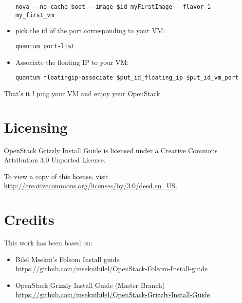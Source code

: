 \begin{itemize}
\begin{verbatim}
nova --no-cache boot --image $id_myFirstImage --flavor 1 my_first_vm 
\end{verbatim}


\item pick the id of the port corresponding to your VM:

\begin{verbatim}
quantum port-list
\end{verbatim}


\item Associate the floating IP to your VM:

\begin{verbatim}
quantum floatingip-associate $put_id_floating_ip $put_id_vm_port
\end{verbatim}


\end{itemize}

That's it ! ping your VM and enjoy your OpenStack.

\chapter{Licensing}
\label{licensing}

OpenStack Grizzly Install Guide is licensed under a Creative Commons
Attribution 3.0 Unported License.

To view a copy of this license, visit
\href{http://creativecommons.org/licenses/by/3.0/deed.en_US}{http:/\slash creativecommons.org\slash licenses\slash by\slash 3.0\slash deed.en\_US}.

\chapter{Credits}
\label{credits}

This work has been based on:

\begin{itemize}
\item Bilel Msekni's Folsom Install guide
 \href{https://github.com/mseknibilel/OpenStack-Folsom-Install-guide}{https:/\slash github.com\slash mseknibilel\slash OpenStack-Folsom-Install-guide}

\item OpenStack Grizzly Install Guide (Master Branch)
 \href{https://github.com/mseknibilel/OpenStack-Grizzly-Install-Guide}{https:/\slash github.com\slash mseknibilel\slash OpenStack-Grizzly-Install-Guide}

\end{itemize}

